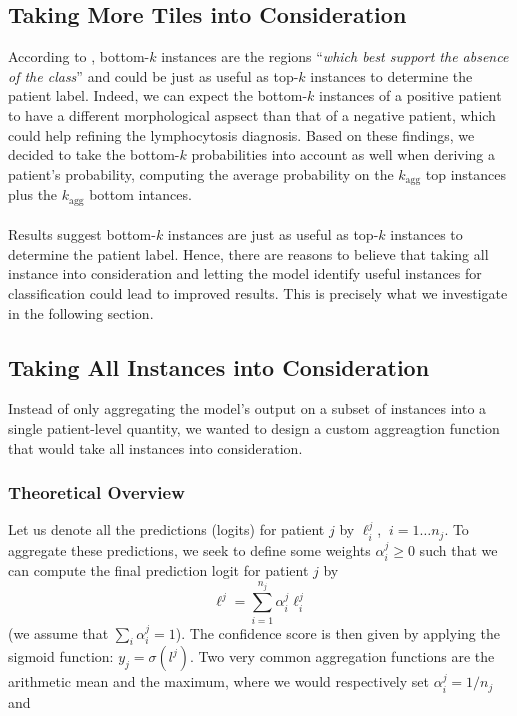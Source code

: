 \documentclass[final]{cvpr}
\begin{document}
	\subsection{Taking More Tiles into Consideration}
	\label{topbottom}
	
	According to \cite{owkin}, bottom-$k$ instances are the regions “\textit{which best support the absence of the class}” and could be just as useful as top-$k$ instances to determine the patient label. Indeed, we can expect the bottom-$k$ instances of a positive patient to have a different morphological aspsect than that of a negative patient, which could help refining the lymphocytosis diagnosis. Based on these findings, we decided to take the bottom-$k$ probabilities into account as well when deriving a patient's probability, computing the average probability on the $k_{\text{agg}}$ top instances plus the $k_{\text{agg}}$ bottom intances.\\
	\\
	Results suggest bottom-$k$ instances are just as useful as top-$k$ instances to determine the patient label. Hence, there are reasons to believe that taking all instance into consideration and letting the model identify useful instances for classification could lead to improved results. This is precisely what we investigate in the following section.
	
	\subsection{Taking All Instances into Consideration}
	
	Instead of only aggregating the model's output on a subset of instances into a single patient-level quantity, we wanted to design a custom aggreagtion function that would take all instances into consideration.
	
	\subsubsection{Theoretical Overview}
	
	Let us denote all the predictions (logits) for patient $j$ by $\ell_i^j$, $\: i=1 \dots n_j$.
	To aggregate these predictions, we seek to define some weights $\alpha_i^j \geq 0$ such that we can compute the final prediction logit for patient $j$ by
	$$\ell^j = \sum_{i=1}^{n_j} \alpha_i^j \ell_i^j$$
	(we assume that $\sum_i \alpha_i^j = 1$).
	The confidence score is then given by applying the sigmoid function: $y_j = \sigma(l^j)$.
	Two very common aggregation functions are the arithmetic mean and the maximum, where we would respectively set $\alpha_i^j = 1/n_j$ and 
	
\end{document}
